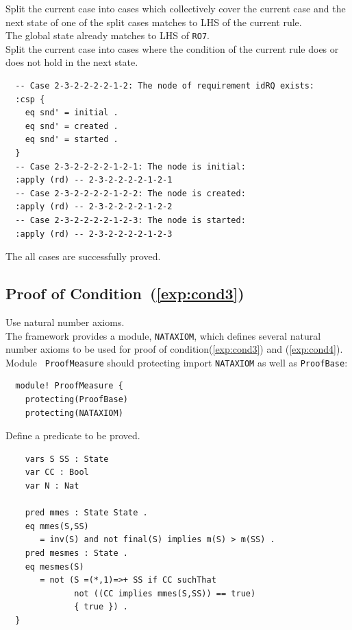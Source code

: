 \documentclass[12pt]{report}
\begin{document}
 Split the current case into cases which
collectively cover the current case and the next state of one of the split cases
matches to LHS of the current rule. \\
The global state already matches to LHS of {\tt RO7}.\\

 Split the current case into cases where the
condition of the current rule does or does not hold in the next state.
\small
\begin{verbatim}
  -- Case 2-3-2-2-2-2-1-2: The node of requirement idRQ exists:
  :csp {
    eq snd' = initial .
    eq snd' = created .
    eq snd' = started .
  }
  -- Case 2-3-2-2-2-2-1-2-1: The node is initial:
  :apply (rd) -- 2-3-2-2-2-2-1-2-1
  -- Case 2-3-2-2-2-2-1-2-2: The node is created:
  :apply (rd) -- 2-3-2-2-2-2-1-2-2
  -- Case 2-3-2-2-2-2-1-2-3: The node is started:
  :apply (rd) -- 2-3-2-2-2-2-1-2-3
\end{verbatim}
\normalsize
The all cases are successfully proved.

\subsection{Proof of Condition~(\ref{exp:cond3})}
\label{sec:TOSCAmesmes}
 Use natural number axioms. \\
The framework provides a module, {\tt NATAXIOM}, which defines several
natural number axioms to be used for proof of
condition(\ref{exp:cond3}) and (\ref{exp:cond4}).  Module {\tt
  ProofMeasure} should protecting import {\tt NATAXIOM} as well as
{\tt ProofBase}:
\small
\begin{verbatim}
  module! ProofMeasure {
    protecting(ProofBase)
    protecting(NATAXIOM)
\end{verbatim}
\normalsize

 Define a predicate to be proved.
\small
\begin{verbatim}
    vars S SS : State
    var CC : Bool
    var N : Nat
      
    pred mmes : State State .
    eq mmes(S,SS)
       = inv(S) and not final(S) implies m(S) > m(SS) .
    pred mesmes : State .
    eq mesmes(S)
       = not (S =(*,1)=>+ SS if CC suchThat
              not ((CC implies mmes(S,SS)) == true)
              { true }) .
  }
\end{verbatim}
\normalsize
\end{document}
